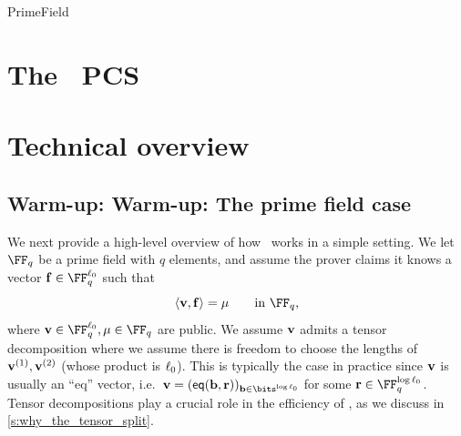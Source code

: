 \begin{lncsmove}{PrimeField}
\iflncs\section{The \ftwoz\ PCS}\label{s:tech_overview}\else\section{Technical overview}\label{s:tech_overview}\fi

   








\iflncs\else %

\fi


\subsection{\iflncs Warm-up: \else\fi Warm-up: The prime field case}\label{s:to_simple_bitz}

We next provide a high-level overview of how \ftwoz\ works in a  simple setting.  We let $\FF_q$ be a prime field with $q$ elements, and assume the prover claims it knows a vector $\bff\in \FF_q^{\codedim_0}$  such that
 \begin{equation}\label{e:new_to_0}\langle \vv, \bff\rangle =\mu \qquad \text{in  } \FF_q,
\end{equation}
where $\vv\in \FF_q^{\codedim_0}, \mu\in \FF_q$ are public.
%
%
%
We assume $\mathbf{v}$ admits a tensor decomposition
%
where we assume there is freedom to choose the lengths of $\mathbf{v}^{(1)},\mathbf{v}^{(2)}$ (whose product is $\ell_0$).  This is typically the case in practice since $\mathbf{v}$ is usually an ``eq'' vector, i.e.\ $\vv=(\eq(\bb,\rr))_{\bb\in \bits^{\log \codedim_0}}$ for some $\rr\in \FF_q^{\log\codedim_0}$. Tensor decompositions play a crucial role in the efficiency of \ftwoz, as we discuss in \cref{s:why_the_tensor_split}.


\end{lncsmove}
